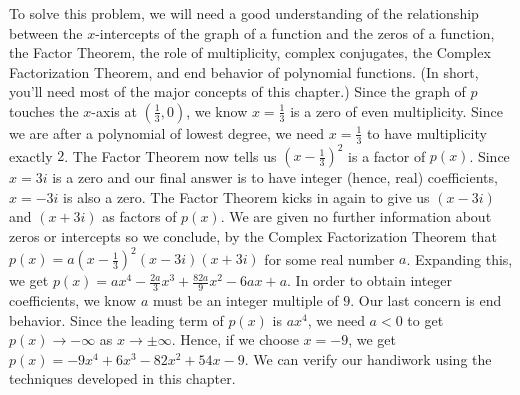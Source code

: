 \documentclass{ximera}
\begin{document}
\begin{exampleSol}
    
    To solve this problem, we will need a good understanding of the relationship between the $x$-intercepts of the graph of a function and the zeros of a function, the Factor Theorem, the role of multiplicity, complex conjugates, the Complex Factorization Theorem, and end behavior of polynomial functions.  (In short, you'll need most of the major concepts of this chapter.)  Since the graph of $p$ touches the $x$-axis at $\left(\frac{1}{3}, 0\right)$, we know $x=\frac{1}{3}$ is a zero of even multiplicity.  Since we are after a polynomial of lowest degree, we need $x=\frac{1}{3}$ to have multiplicity exactly $2$. The Factor Theorem now tells us  $\left(x-\frac{1}{3}\right)^2$ is a factor of $p(x)$.  Since $x=3i$ is a zero and our final answer is to have integer (hence, real) coefficients, $x=-3i$ is also a zero.  The Factor Theorem kicks in again to give us $(x-3i)$ and $(x+3i)$ as factors of $p(x)$.  We are given no further information about zeros or intercepts so we conclude, by the Complex Factorization Theorem that $p(x) = a \left(x-\frac{1}{3}\right)^2 (x-3i)(x+3i)$ for some real number $a$.  Expanding this, we get $p(x) =  ax^4-\frac{2a}{3} x^3+\frac{82a}{9} x^2-6ax+a$.  In order to obtain integer coefficients, we know $a$ must be an integer multiple of $9$.  Our last concern is end behavior.  Since the leading term of $p(x)$ is $ax^4$, we need $a < 0$ to get $p(x) \rightarrow -\infty$ as $x \rightarrow \pm \infty$. Hence, if we choose $x=-9$, we get $p(x) = -9x^4+ 6 x^3 - 82 x^2+54x-9$.    We can verify our handiwork using the techniques developed in this chapter.  
    

\end{exampleSol}
\end{document}
